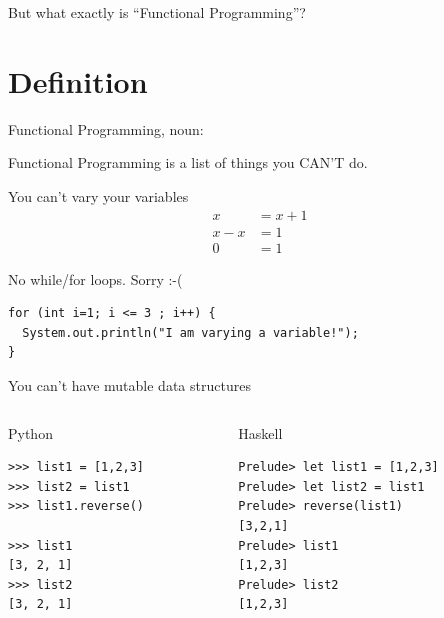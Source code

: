 \documentclass[mathserif]{beamer}
\begin{document}
\begin{frame}

  \begin{center}
  {\Huge But what exactly is ``Functional Programming''?}
  \end{center}

\end{frame}

\section{Definition}

\begin{frame}{Functional Programming, noun:}

  \begin{exampleblock}{}
    {\Huge
      Functional Programming is a list of things you CAN’T do.
      }
    \vskip5mm
    \hspace*{}
  \end{exampleblock}
\end{frame}


\begin{frame}{You can't vary your variables}
  \begin{align*}
      x     & = x + 1\\
      x - x & = 1\\
      0     & = 1
  \end{align*}
\end{frame}

\begin{frame}[fragile]{No while/for loops. Sorry :-(}
  \begin{verbatim}
for (int i=1; i <= 3 ; i++) {
  System.out.println("I am varying a variable!");
}
  \end{verbatim}
\end{frame}

\begin{frame}[fragile]{You can't have mutable data structures}
     \begin{columns}[t] %
     \begin{column}[T]{5cm} %
Python
       \begin{verbatim}
>>> list1 = [1,2,3]
>>> list2 = list1
>>> list1.reverse()

>>> list1
[3, 2, 1]
>>> list2
[3, 2, 1]
       \end{verbatim}
     \end{column}

     \begin{column}[T]{5cm} %
Haskell
       \begin{verbatim}
Prelude> let list1 = [1,2,3]
Prelude> let list2 = list1
Prelude> reverse(list1)
[3,2,1]
Prelude> list1
[1,2,3]
Prelude> list2
[1,2,3]
       \end{verbatim}
     \end{column}
     \end{columns}
\end{frame}
\end{document}
